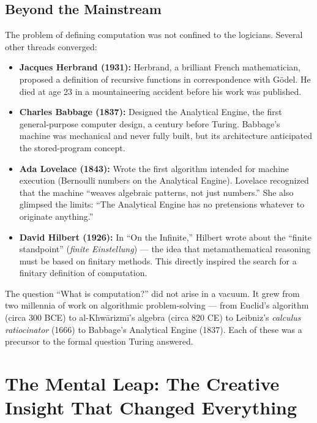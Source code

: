 \subsection*{Beyond the Mainstream}

The problem of defining computation was not confined to the logicians. Several other threads converged:

\begin{itemize}
\item \textbf{Jacques Herbrand (1931):} Herbrand, a brilliant French mathematician, proposed a definition of recursive functions in correspondence with G\"odel. He died at age 23 in a mountaineering accident before his work was published.
\item \textbf{Charles Babbage (1837):} Designed the Analytical Engine, the first general-purpose computer design, a century before Turing. Babbage's machine was mechanical and never fully built, but its architecture anticipated the stored-program concept.
\item \textbf{Ada Lovelace (1843):} Wrote the first algorithm intended for machine execution (Bernoulli numbers on the Analytical Engine). Lovelace recognized that the machine ``weaves algebraic patterns, not just numbers.'' She also glimpsed the limits: ``The Analytical Engine has no pretensions whatever to originate anything.''
\item \textbf{David Hilbert (1926):} In ``On the Infinite,'' Hilbert wrote about the ``finite standpoint'' (\emph{finite Einstellung}) --- the idea that metamathematical reasoning must be based on finitary methods. This directly inspired the search for a finitary definition of computation.
\end{itemize}

The question ``What is computation?'' did not arise in a vacuum. It grew from two millennia of work on algorithmic problem-solving --- from Euclid's algorithm (circa 300 BCE) to al-Khw\=arizm\=i's algebra (circa 820 CE) to Leibniz's \emph{calculus ratiocinator} (1666) to Babbage's Analytical Engine (1837). Each of these was a precursor to the formal question Turing answered.

\section{The Mental Leap: The Creative Insight That Changed Everything}
\label{sec:computation:leap}

